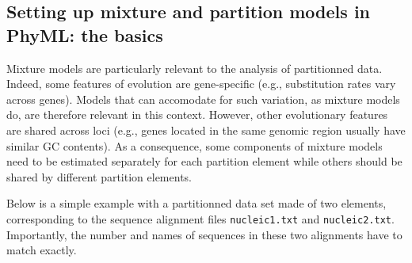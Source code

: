 \documentclass[a4paper,12pt]{article}
\newcommand{\x}[1]{\texttt{#1}}
\begin{document}



\subsection{Setting up mixture and partition models in PhyML: the basics}

Mixture models are particularly relevant to the analysis of partitionned data. Indeed, some features
of  evolution are  gene-specific (e.g.,  substitution  rates vary  across genes).   Models that  can
accomodate  for such  variation,  as mixture  models do,  are  therefore relevant  in this  context.
However, other evolutionary features are shared across loci (e.g., genes located in the same genomic
region usually have similar  GC contents). As a consequence, some components  of mixture models need
to be  estimated separately for each  partition element while  others should be shared  by different
partition elements.

Below is a simple example with a partitionned data set made of two elements, corresponding to the
sequence alignment files \x{nucleic1.txt} and \x{nucleic2.txt}. Importantly, the number and names of
sequences in these two alignments have to match exactly. 
\end{document}
